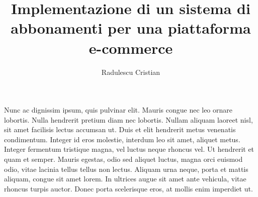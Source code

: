 \documentclass[target=bach,aauheader=,style=]{thud}
\title{Implementazione di un sistema di abbonamenti per una piattaforma e-commerce}
\author{Radulescu Cristian}
\begin{document}
\maketitle



\abstract
Nunc ac dignissim ipsum, quis pulvinar elit. Mauris congue nec leo ornare lobortis. Nulla hendrerit pretium diam nec lobortis. Nullam aliquam laoreet nisl, sit amet facilisis lectus accumsan ut. Duis et elit hendrerit metus venenatis condimentum. Integer id eros molestie, interdum leo sit amet, aliquet metus. Integer fermentum tristique magna, vel luctus neque rhoncus vel. Ut hendrerit et quam et semper. Mauris egestas, odio sed aliquet luctus, magna orci euismod odio, vitae lacinia tellus tellus non lectus. Aliquam urna neque, porta et mattis aliquam, congue sit amet lorem. In ultrices augue sit amet ante vehicula, vitae rhoncus turpis auctor. Donec porta scelerisque eros, at mollis enim imperdiet ut. 

\tableofcontents



\mainmatter

\end{document}
